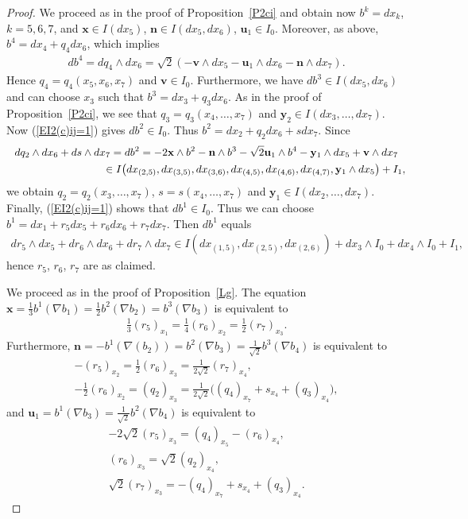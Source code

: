 \documentclass[pdftex]{sigma}
\numberwithin{equation}{section}
\newcommand\bx{{\mathbf x}}
\newcommand\bu{{\mathbf u}}
\newcommand\by{{\mathbf y}}
\newcommand\bn{{\mathbf n}}
\newcommand\bv{{\mathbf v}}
\begin{document}
\begin{proof} We proceed as in the proof of Proposition~\ref{P2ci} and obtain now $b^k=dx_k$, $k=5,6,7$, and $\bx\in I(dx_5)$, $\bn\in I(dx_5,dx_6)$, $\bu_1\in I_0$. Moreover, as above, $b^4=dx_4+q_4 dx_6$, which implies
\begin{gather*}db^4=dq_4\wedge dx_6=\sqrt2 (-\bv\wedge dx_5-\bu_1\wedge dx_6 -\bn\wedge dx_7).\end{gather*}
Hence $q_4=q_4(x_5,x_6,x_7)$ and $\bv\in I_0$. Furthermore, we have $db^3\in I(dx_5,dx_6)$ and can choose $x_3$ such that $b^3=dx_3+q_3dx_6$. As in the proof of Proposition~\ref{P2ci}, we see that $q_3=q_3(x_4,\dots,x_7)$ and $\by_2\in I(dx_3,\dots,dx_7)$. Now (\ref{EI2(c)ij=1}) gives $db^2\in I_0$. Thus $b^2=dx_2+q_2dx_6+sdx_7$. Since
\begin{gather*}
dq_2\wedge dx_6+ds\wedge dx_7 = db^2=-2\bx\wedge b^2 -\bn\wedge b^3-\sqrt2 \bu_1\wedge b^4-\by_1\wedge dx_5+\bv\wedge dx_7\\
\hphantom{dq_2\wedge dx_6+ds\wedge dx_7}{} \in I\big(dx_{(2,5)}, dx_{(3,5)}, dx_{(3,6)}, dx_{(4,5)}, dx_{(4,6)},dx_{(4,7)}, \by_1\wedge dx_5\big)+I_1,
\end{gather*}
we obtain $q_2=q_2(x_3,\dots,x_7)$, $s=s(x_4,\dots,x_7)$ and $\by_1\in I(dx_2,\dots,dx_7)$. Finally, (\ref{EI2(c)ij=1}) shows that $db^1\in I_0$. Thus we can choose $b^1=dx_1+ r_5dx_5+r_6dx_6+r_7dx_7$. Then $db^1$ equals
\begin{gather*}
dr_5\wedge dx_5+dr_6\wedge dx_6+dr_7\wedge dx_7\in I( dx_{(1,5)}, dx_{(2,5)}, dx_{(2,6)})+ dx_3\wedge I_0 +dx_4\wedge I_0+I_1,
\end{gather*}
hence $r_5$, $r_6$, $r_7$ are as claimed.

We proceed as in the proof of Proposition~\ref{Lg}. The equation $\bx=\frac13 b^1(\nabla b_1)=\frac12 b^2(\nabla b_2)=b^3(\nabla b_3)$ is equivalent to
\begin{gather}
\tfrac13(r_5)_{x_1} = \tfrac14(r_6)_{x_2} =\tfrac12 (r_7)_{x_3}.\label{ED1b}
\end{gather}
Furthermore, $\bn=-b^1(\nabla(b_2))=b^2(\nabla b_3)=\frac1{\sqrt 2} b^3(\nabla b_4)$ is equivalent to
\begin{gather}
 -(r_5)_{x_2} =\tfrac12 (r_6)_{x_3}=\tfrac1{2\sqrt 2} (r_7)_{x_4},\label{ED2b}\\
- \tfrac12 (r_6)_{x_2} =(q_2)_{x_3} =\tfrac1{2\sqrt 2}\big((q_4)_{x_7}+s_{x_4}+(q_3)_{x_4}\big), \label{E60}
\end{gather}
and $\bu_1= b^1(\nabla b_3) =\frac 1{\sqrt2}b^2(\nabla b_4 )$ is equivalent to
\begin{gather}
 -2\sqrt2 (r_5)_{x_3}=(q_4)_{x_5} -(r_6)_{x_4},\label{E61}\\
 (r_6)_{x_3}=\sqrt2 (q_2)_{x_4}, \label{E62}\\
 \sqrt2(r_7)_{x_3}= -(q_4)_{x_7} +s_{x_4}+(q_3)_{x_4} . \label{ED3b}
 \end{gather}


\end{proof}
\end{document}
